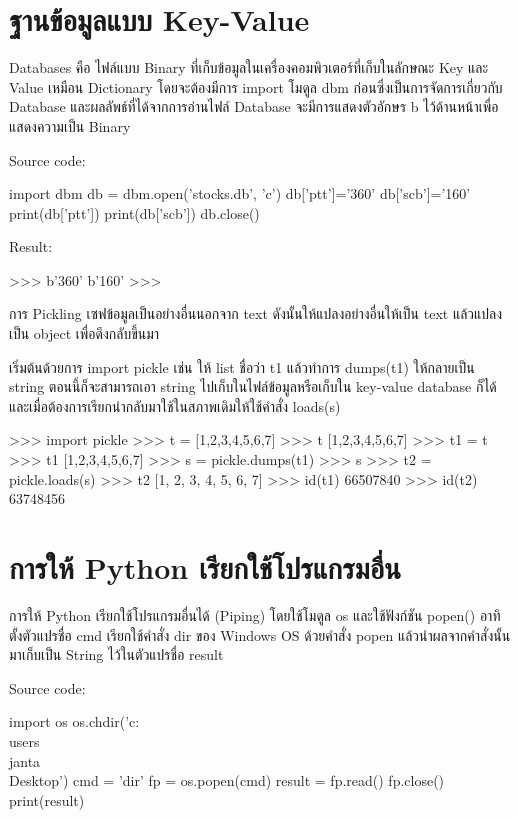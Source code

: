 \section{ฐานข้อมูลแบบ Key-Value}

Databases คือ ไฟล์แบบ Binary ที่เก็บข้อมูลในเครื่องคอมพิวเตอร์ที่เก็บในลักษณะ Key และ Value เหมือน Dictionary โดยจะต้องมีการ import โมดูล dbm ก่อนซึ่งเป็นการจัดการเกี่ยวกับ Database และผลลัพธ์ที่ได้จากการอ่านไฟล์ Database จะมีการแสดงตัวอักษร b ไว้ด้านหน้าเพื่อแสดงความเป็น Binary

Source code:
\begin{pycode}
import dbm
db = dbm.open('stocks.db', 'c')
db['ptt']='360'
db['scb']='160'
print(db['ptt'])
print(db['scb'])
db.close()
\end{pycode}

Result:
\begin{pycode}
>>>
b'360'
b'160'
>>>
\end{pycode}


การ Pickling เซฟข้อมูลเป็นอย่างอื่นนอกจาก text ดังนั้นให้แปลงอย่างอื่นให้เป็น text แล้วแปลงเป็น object เพื่อดึงกลับขึ้นมา

เริ่มต้นด้วยการ import pickle เช่น ให้ list ชื่อว่า t1 แล้วทำการ dumps(t1) ให้กลายเป็น string ตอนนี้ก็จะสามารถเอา string ไปเก็บในไฟล์ข้อมูลหรือเก็บใน key-value database ก็ได้ และเมื่อต้องการเรียกนำกลับมาใช้ในสภาพเดิมให้ใช้คำสั่ง loads(s) 

\begin{pycode}
>>> import pickle
>>> t = [1,2,3,4,5,6,7]
>>> t
[1,2,3,4,5,6,7]
>>> t1 = t
>>> t1
[1,2,3,4,5,6,7]
>>> s = pickle.dumps(t1)
>>> s
>>> t2 = pickle.loads(s)
>>> t2
[1, 2, 3, 4, 5, 6, 7]
>>> id(t1)
66507840
>>> id(t2)
63748456
\end{pycode}



\section{การให้ Python เรียกใช้โปรแกรมอื่น}

การให้ Python เรียกใช้โปรแกรมอื่นได้ (Piping) โดยใช้โมดูล os และใช้ฟังก์ชัน popen()  อาทิ ตั้งตัวแปรชื่อ cmd เรียกใช้คำสั่ง dir ของ Windows OS ด้วยคำสั่ง popen แล้วนำผลจากคำสั่งนั้นมาเก็บเป็น String ไว้ในตัวแปรชื่อ result 

Source code:
\begin{pycode}
import os
os.chdir('c:\\users\\janta\\Desktop')
cmd = 'dir'
fp = os.popen(cmd)
result = fp.read()
fp.close()
print(result)

\end{pycode}

